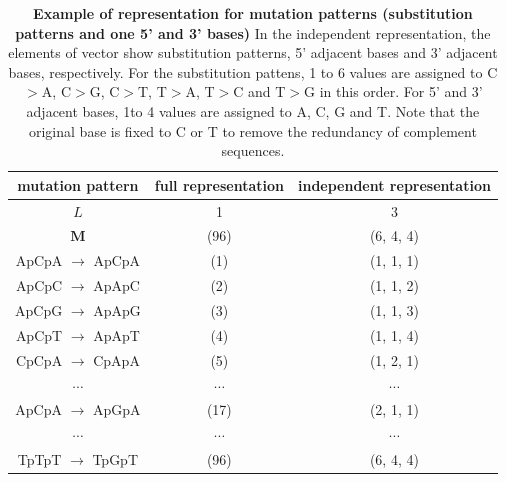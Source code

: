 \begin{table}[!ht]
\caption{
{\bf Example of representation for mutation patterns (substitution patterns and one 5' and 3' bases)}
In the independent representation, the elements of vector show substitution patterns, 5' adjacent bases and 3' adjacent bases, respectively.
For the substitution pattens, 1 to 6 values are assigned to C$>$A, C$>$G, C$>$T, T$>$A, T$>$C and T$>$G in this order.
For 5' and 3' adjacent bases, 1to 4 values are assigned to A, C, G and T.
Note that the original base is fixed to C or T to remove the redundancy of complement sequences.
}
\begin{center}
\begin{tabular}{|c|c|c|} \hline
mutation pattern & full representation & independent representation  \\ \hline
$L$ & 1  & 3  \\
$\bm{M}$ & (96)  & (6, 4, 4) \\  \hline
ApCpA $\to$ ApCpA & (1)  & (1, 1, 1)  \\ 
ApCpC $\to$ ApApC & (2)  & (1, 1, 2)  \\ 
ApCpG $\to$ ApApG & (3)  & (1, 1, 3)  \\
ApCpT $\to$ ApApT & (4)  & (1, 1, 4)  \\
CpCpA $\to$ CpApA & (5)  & (1, 2, 1) \\
$\cdots$ & $\cdots$ & $\cdots$ \\
ApCpA $\to$ ApGpA & (17)  & (2, 1, 1) \\
$\cdots$ & $\cdots$ & $\cdots$ \\
TpTpT $\to$ TpGpT & (96)  & (6, 4, 4) \\ \hline
\end{tabular}
\end{center}
\label{tab_rep}
\end{table}



\clearpage

